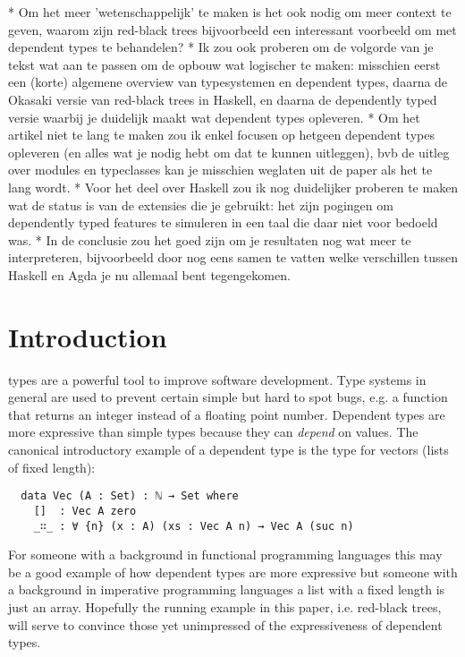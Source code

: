 \documentclass[journal]{../IEEEtemplate/IEEEtran}
\begin{document}
* Om het meer 'wetenschappelijk' te maken is het ook nodig om meer context te geven, waarom zijn red-black trees bijvoorbeeld een interessant voorbeeld om met dependent types te behandelen?
* Ik zou ook proberen om de volgorde van je tekst wat aan te passen om de opbouw wat logischer te maken: misschien eerst een (korte) algemene overview van typesystemen en dependent types, daarna de Okasaki versie van red-black trees in Haskell, en daarna de dependently typed versie waarbij je duidelijk maakt wat dependent types opleveren.
* Om het artikel niet te lang te maken zou ik enkel focusen op hetgeen dependent types opleveren (en alles wat je nodig hebt om dat te kunnen uitleggen), bvb de uitleg over modules en typeclasses kan je misschien weglaten uit de paper als het te lang wordt.
* Voor het deel over Haskell zou ik nog duidelijker proberen te maken wat de status is van de extensies die je gebruikt: het zijn pogingen om dependently typed features te simuleren in een taal die daar niet voor bedoeld was.
* In de conclusie zou het goed zijn om je resultaten nog wat meer te interpreteren, bijvoorbeeld door nog eens samen te vatten welke verschillen tussen Haskell en Agda je nu allemaal bent tegengekomen.


\section{Introduction}
 types are a powerful tool to improve software
development.
Type systems in general are used to prevent certain simple but hard to spot
bugs, e.g. a function that returns an integer instead of a floating point
number.
Dependent types are more expressive than simple types because they can
\emph{depend} on values.
The canonical introductory example of a dependent type is the type for vectors
(lists of fixed length):

\begin{verbatim}
  data Vec (A : Set) : ℕ → Set where
    []  : Vec A zero
    _∷_ : ∀ {n} (x : A) (xs : Vec A n) → Vec A (suc n)
\end{verbatim}

For someone with a background in functional programming languages this may be
a good example of how dependent types are more expressive but someone with a
background in imperative programming languages a list with a fixed length is
just an array.
Hopefully the running example in this paper, i.e. red-black trees, will serve
to convince those yet unimpressed of the expressiveness of dependent types.
\end{document}
